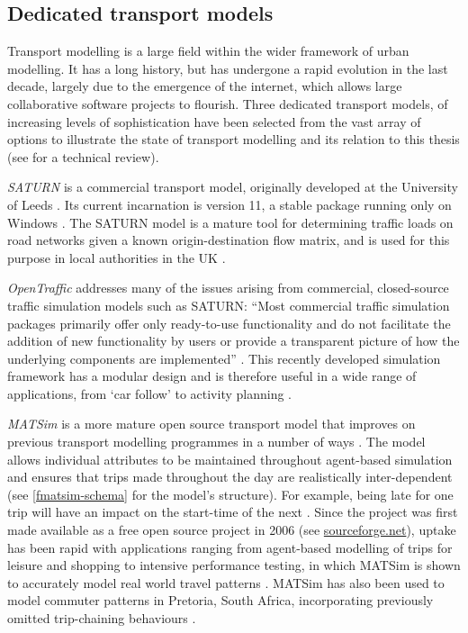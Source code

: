 \documentclass[a4paper, 11pt, twoside]{Thesis}
\begin{document}
\label{s:agent-based}
\subsection{Dedicated transport models}
\label{s:dedicated}
Transport modelling is a large field within the wider framework of
urban modelling. It has a long history, but has undergone a rapid
evolution in the last decade, largely due to the emergence of the
internet, which allows large collaborative software projects to flourish.
Three dedicated transport models, of increasing levels of sophistication
have been selected from the
vast array of options to illustrate the state of transport modelling
and its relation to this thesis
(see \citealp{Rasouli2012} for a technical review).

\emph{SATURN} is a commercial transport model, originally
developed at the University of
Leeds \citep{boxill2000evaluation}. Its current incarnation
is version 11, a stable package running only on Windows \citep{SATURN2012}.
The SATURN model is a mature tool for determining traffic loads on road
networks given a known origin-destination flow matrix,
and is used for this purpose in local authorities in the UK
\citep{boyce2005urban}.

\emph{OpenTraffic} addresses many of the issues arising from commercial,
closed-source traffic simulation models such as SATURN: ``Most commercial
traffic simulation packages primarily offer only ready-to-use
functionality and do not facilitate the addition of new
functionality by users or provide a transparent picture of how the
underlying components are implemented'' \citep[44]{Tamminga2012}.
This recently developed simulation framework has a modular design
and is therefore useful in a wide range of applications, from
`car follow' to activity planning \citep{Tamminga2012}.

\emph{MATSim} is a more mature open source transport model that improves
on previous transport modelling programmes in a number of ways
\citep{rieser2007agent}. 
The model allows individual attributes to be maintained throughout
agent-based simulation and ensures that trips made throughout the
day are realistically inter-dependent (see \cref{fmatsim-schema} for the
model's structure). For example, being late for one trip
will have an impact on the start-time of the next \citep{Balmer2009}.
Since the project was first made available as a free open source project
in 2006 (see \href{http://sourceforge.net/projects/matsim/files/MATSim/}{sourceforge.net}),
uptake has been rapid with applications ranging from agent-based
modelling of trips for leisure and shopping \citep{horni2009location}
to intensive
performance testing, in which MATSim is shown to accurately
model real world travel patterns \citep{balmer2008agenta, gao2010comparison}.
MATSim has also been used to model commuter patterns in Pretoria, South Africa,
incorporating previously omitted trip-chaining behaviours \citep{van2011agent}.
\end{document}
